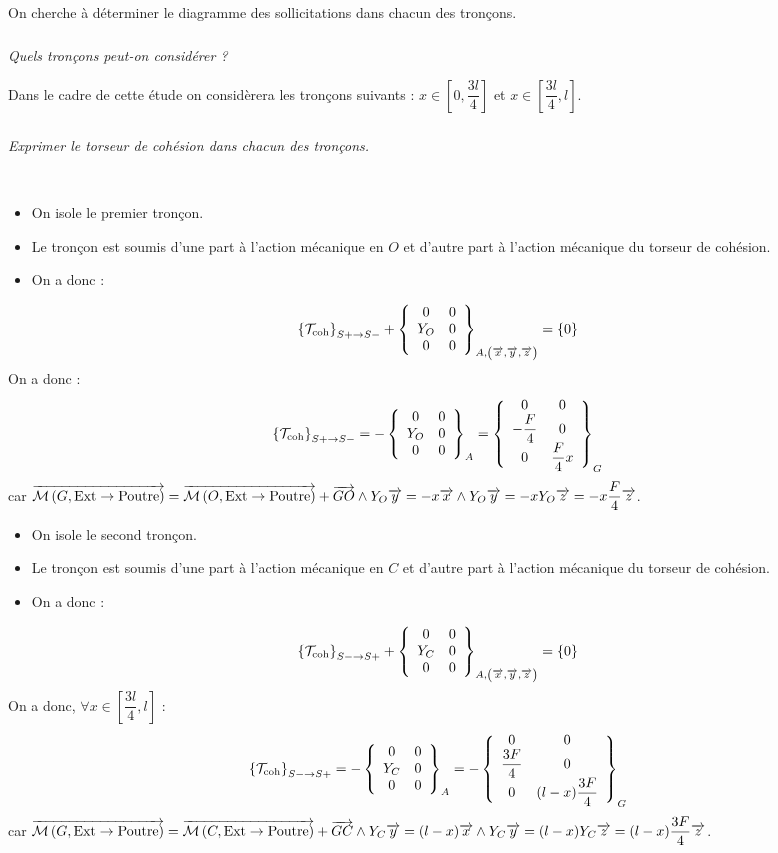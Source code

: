 \documentclass[10pt,fleqn]{article} %
\begin{document}
\begin{multicols}{2}
\begin{corrige}
\end{corrige}
\else 
\fi
On cherche à déterminer le diagramme des sollicitations dans chacun des tronçons.

\subparagraph{}
\textit{Quels tronçons peut-on considérer ?}
\ifprof
\begin{corrige}
Dans le cadre de cette étude on considèrera les tronçons suivants : $x\in\left[0,\dfrac{3l}{4}\right]$ et $x\in\left[\dfrac{3l}{4},l\right]$.

\end{corrige}
\else 
\fi

\subparagraph{}
\textit{Exprimer le torseur de cohésion dans chacun des tronçons.}
\ifprof
\begin{corrige}~\\
\begin{itemize}[label=,font=\color{ocre}] 
\item On isole le premier tronçon.
\item Le tronçon est soumis d'une part à l'action mécanique en $O$ et d'autre part à l'action mécanique du torseur de cohésion.
\item On a donc :
\end{itemize}
$$
\torseurscoh_{S+\rightarrow S-} + \torseurcol{0}{Y_O}{0}{0}{0}{0}{A,\left( \vect{x},\vect{y},\vect{z} \right)} = \{0\}
$$
On a donc :
$$\torseurscoh_{S+\rightarrow S-}
=-\torseurcol{0}{Y_O}{0}{0}{0}{0}{A}
=\torseurcol{0}{-\dfrac{F}{4}}{0}{0}{0}{ \dfrac{F}{4}x}{G}
$$
car $\vectm{G}{\text{Ext}}{\text{Poutre}}=\vectm{O}{\text{Ext}}{\text{Poutre}} + \vect{GO}\wedge Y_O \vect{y}  = -x\vect{x} \wedge Y_O \vect{y} = -x Y_O \vect{z}= -x \dfrac{F}{4} \vect{z}$.

\begin{itemize}[label=,font=\color{ocre}] 
\item On isole le second tronçon.
\item Le tronçon est soumis d'une part à l'action mécanique en $C$ et d'autre part à l'action mécanique du torseur de cohésion.
\item On a donc :
\end{itemize}
$$
\torseurscoh_{S-\rightarrow S+} + \torseurcol{0}{Y_C}{0}{0}{0}{0}{A,\left( \vect{x},\vect{y},\vect{z} \right)} = \{0\}
$$
On a donc, $\forall x \in\left[\dfrac{3l}{4},l\right]$ :
$$
\torseurscoh_{S-\rightarrow S+}
=-\torseurcol{0}{Y_C}{0}{0}{0}{0}{A}
=-\torseurcol{0}{\dfrac{3F}{4}}{0}{0}{0}{ (l-x) \dfrac{3F}{4}}{G}
$$
car $\vectm{G}{\text{Ext}}{\text{Poutre}}=\vectm{C}{\text{Ext}}{\text{Poutre}} + \vect{GC}\wedge Y_C \vect{y}  = (l-x)\vect{x} \wedge Y_C \vect{y} = (l-x) Y_C \vect{z}= (l-x) \dfrac{3F}{4} \vect{z}$.


\end{corrige}
\end{multicols}
\end{document}
